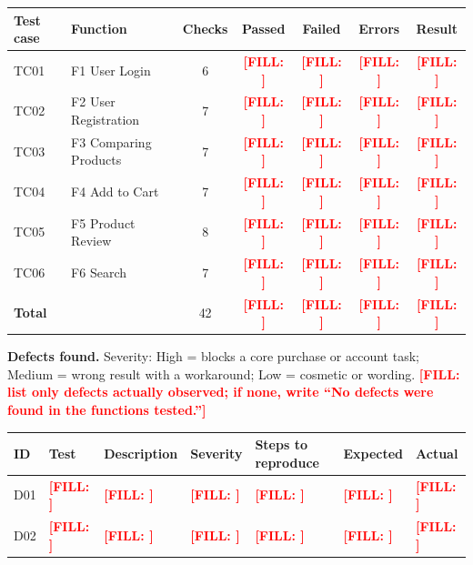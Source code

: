 \documentclass[11pt,a4paper]{article}
\newcommand{\FILL}[1]{\textcolor{red}{\textbf{[FILL: #1]}}}
\begin{document}
\begin{center}
{\renewcommand{\arraystretch}{1.2}
\begin{tabular}{|l|l|c|c|c|c|c|}
\hline
\cellcolor{headgray}\textbf{Test case} & \cellcolor{headgray}\textbf{Function} & \cellcolor{headgray}\textbf{Checks} & \cellcolor{headgray}\textbf{Passed} & \cellcolor{headgray}\textbf{Failed} & \cellcolor{headgray}\textbf{Errors} & \cellcolor{headgray}\textbf{Result} \\ \hline
TC01 & F1 User Login           & 6 & \FILL{} & \FILL{} & \FILL{} & \FILL{} \\ \hline
TC02 & F2 User Registration    & 7 & \FILL{} & \FILL{} & \FILL{} & \FILL{} \\ \hline
TC03 & F3 Comparing Products   & 7 & \FILL{} & \FILL{} & \FILL{} & \FILL{} \\ \hline
TC04 & F4 Add to Cart          & 7 & \FILL{} & \FILL{} & \FILL{} & \FILL{} \\ \hline
TC05 & F5 Product Review       & 8 & \FILL{} & \FILL{} & \FILL{} & \FILL{} \\ \hline
TC06 & F6 Search               & 7 & \FILL{} & \FILL{} & \FILL{} & \FILL{} \\ \hline
\textbf{Total} &               & 42 & \FILL{} & \FILL{} & \FILL{} & \FILL{} \\ \hline
\end{tabular}}
\end{center}

\textbf{Defects found.} Severity: High = blocks a core purchase or account task; Medium = wrong result with a workaround; Low = cosmetic or wording. \FILL{list only defects actually observed; if none, write ``No defects were found in the functions tested.''}

{\small\renewcommand{\arraystretch}{1.25}
\begin{longtable}{|L{0.8cm}|L{1.4cm}|L{2.8cm}|L{1.4cm}|L{3.2cm}|L{2.4cm}|L{2.4cm}|}
\hline
{}\textbf{ID} & \textbf{Test} & \textbf{Description} & \textbf{Severity} & \textbf{Steps to reproduce} & \textbf{Expected} & \textbf{Actual} \\ \hline
D01 & \FILL{} & \FILL{} & \FILL{} & \FILL{} & \FILL{} & \FILL{} \\ \hline
D02 & \FILL{} & \FILL{} & \FILL{} & \FILL{} & \FILL{} & \FILL{} \\ \hline
\end{longtable}}
\end{document}
